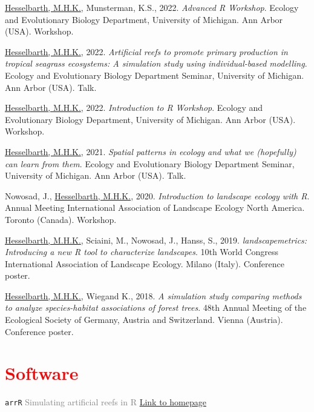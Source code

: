 \documentclass[hidelinks]{report}
\begin{document}
\begin{hangparas}{7.5mm}{1}

\underline{Hesselbarth, M.H.K.}, Munsterman, K.S., 2022. \textit{Advanced R Workshop}. Ecology and Evolutionary Biology Department, University of Michigan. Ann Arbor (USA). Workshop.

\underline{Hesselbarth, M.H.K.}, 2022. \textit{Artificial reefs to promote primary production in tropical seagrass ecosystems: A simulation study using individual-based modelling}. Ecology and Evolutionary Biology Department Seminar, University of Michigan. Ann Arbor (USA). Talk.

\underline{Hesselbarth, M.H.K.}, 2022. \textit{Introduction to R Workshop}. Ecology and Evolutionary Biology Department, University of Michigan. Ann Arbor (USA). Workshop.

\underline{Hesselbarth, M.H.K.}, 2021. \textit{Spatial patterns in ecology and what we (hopefully) can learn from them}. Ecology and Evolutionary Biology Department Seminar, University of Michigan. Ann Arbor (USA). Talk.

Nowosad, J., \underline{Hesselbarth, M.H.K.}, 2020. \textit{Introduction to landscape ecology with R}. Annual Meeting International Association of Landscape Ecology North America. Toronto (Canada). Workshop.

\underline{Hesselbarth, M.H.K.}, Sciaini, M., Nowosad, J., Hanss, S., 2019. \textit{landscapemetrics: Introducing a new R tool to characterize landscapes}. 10th World Congress International Association of Landscape Ecology. Milano (Italy). Conference poster.

\underline{Hesselbarth, M.H.K.}, Wiegand K., 2018. \textit{A simulation study comparing methods to analyze species-habitat associations of forest trees}. 48th Annual Meeting of the Ecological Society of Germany, Austria and Switzerland. Vienna (Austria). Conference poster.

\end{hangparas}


\section*{\textcolor{red}{Software} \sout{\hfill}}

\texttt{arrR} \textcolor{grey}{Simulating artificial reefs in R}
\hfill
\textcolor{blue}{\href{https://allgeier-lab.github.io/arrR/}{Link to homepage}}
\end{document}
